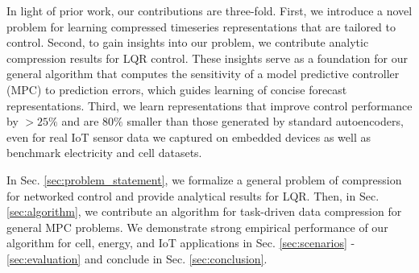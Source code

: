 In light of prior work, our contributions are three-fold. First, we introduce a novel problem for learning compressed timeseries representations that are tailored to control. 
Second, to gain insights into our problem, we contribute analytic compression results for LQR control. These insights serve as a foundation for our general algorithm that computes the sensitivity of a model predictive controller (MPC) to prediction errors, which guides learning of concise forecast representations.
Third, we learn representations that improve control performance by $>25\%$ and are $80\%$ smaller than those generated by standard autoencoders, even for real IoT sensor data we captured on embedded devices as well as benchmark electricity and cell datasets.

In Sec. \ref{sec:problem_statement}, we formalize a general problem of compression for networked control and provide analytical results for LQR. Then, in Sec. \ref{sec:algorithm}, we contribute an algorithm for task-driven data compression for general MPC problems. We demonstrate strong empirical performance of our algorithm for cell, energy, and IoT applications in Sec. \ref{sec:scenarios} - \ref{sec:evaluation} and conclude in Sec. \ref{sec:conclusion}.


